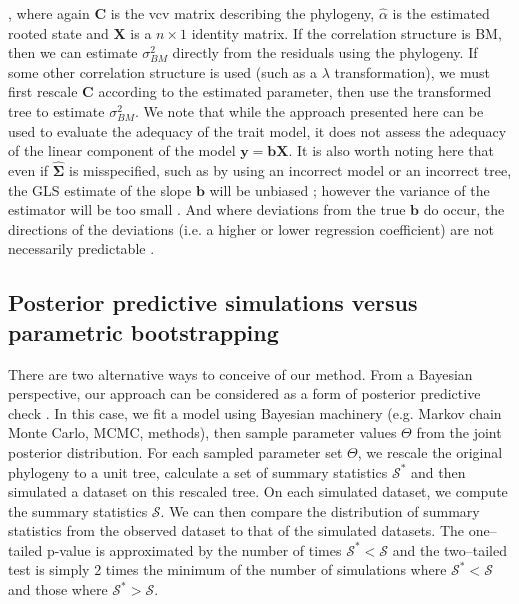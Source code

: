 \documentclass[a4paper,12pt]{article}
\begin{document}
\citep{GarlandIves2000, Freckleton2002}, where again $\mathbf{C}$ is the vcv matrix describing the phylogeny, $\hat{\alpha}$ is the estimated rooted state and $\mathbf{X}$ is a $n \times 1$ identity matrix. If the correlation structure is BM, then we can estimate $\sigma^2_{BM}$ directly from the residuals using the phylogeny. If some other correlation structure is used (such as a $\lambda$ transformation), we must first rescale $\mathbf{C}$ according to the estimated parameter, then use the transformed tree to estimate $\sigma^2_{BM}$. We note that while the approach presented here can be used to evaluate the adequacy of the trait model, it does not assess the adequacy of the linear component of the model $\mathbf{y} = \mathbf{b}\mathbf{X}$. It is also worth noting here that even if $\hat{\mathbf{\Sigma}}$ is misspecified, such as by using an incorrect model or an incorrect tree, the GLS estimate of the slope $\mathbf{b}$ will be unbiased \citep{Rao1999}; however the variance of the estimator will be too small \citep{Rohlf2006}. And where deviations from the true $\mathbf{b}$ do occur, the directions of the deviations (i.e. a higher or lower regression coefficient) are not necessarily predictable \citep{Rohlf2006}.

\subsection*{Posterior predictive simulations versus parametric bootstrapping}
There are two alternative ways to conceive of our method. From a Bayesian perspective, our approach can be considered as a form of posterior predictive check \citep{Rubin1984, Gelman1996, Gelmanbook}. In this case, we fit a model using Bayesian machinery (e.g. Markov chain Monte Carlo, MCMC, methods), then sample parameter values $\Theta$ from the joint posterior distribution. For each sampled parameter set $\Theta$, we rescale the original phylogeny to a unit tree, calculate a set of summary statistics $\mathcal{S}^*$ and then simulated a dataset on this rescaled tree. On each simulated dataset, we compute the summary statistics $\mathcal{S}$. We can then compare the distribution of summary statistics from the observed dataset to that of the simulated datasets. The one--tailed p-value is approximated by the number of times $\mathcal{S}^* < \mathcal{S}$ and the two--tailed test is simply 2 times the minimum of the number of simulations where $\mathcal{S}^* < \mathcal{S}$ and those where $\mathcal{S}^* > \mathcal{S}$.
\end{document}
